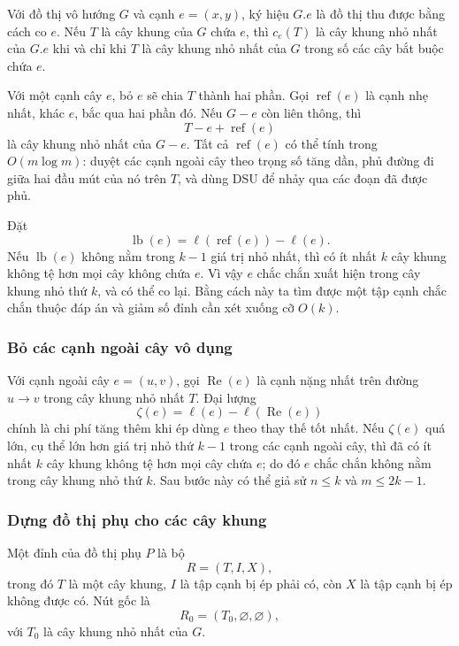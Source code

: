 \documentclass[11pt]{article}
\begin{document}
Với đồ thị vô hướng \(G\) và cạnh \(e=(x,y)\), ký hiệu \(G.e\) là đồ thị thu
được bằng cách co \(e\). Nếu \(T\) là cây khung của \(G\) chứa \(e\), thì
\(c_e(T)\) là cây khung nhỏ nhất của \(G.e\) khi và chỉ khi \(T\) là cây khung
nhỏ nhất của \(G\) trong số các cây bắt buộc chứa \(e\).

Với một cạnh cây \(e\), bỏ \(e\) sẽ chia \(T\) thành hai phần. Gọi
\(\operatorname{ref}(e)\) là cạnh nhẹ nhất, khác \(e\), bắc qua hai phần đó.
Nếu \(G-e\) còn liên thông, thì
\[
  T-e+\operatorname{ref}(e)
\]
là cây khung nhỏ nhất của \(G-e\). Tất cả \(\operatorname{ref}(e)\) có thể tính
trong \(O(m\log m)\): duyệt các cạnh ngoài cây theo trọng số tăng dần, phủ
đường đi giữa hai đầu mút của nó trên \(T\), và dùng DSU để nhảy qua các đoạn
đã được phủ.

Đặt
\[
  \operatorname{lb}(e)=\ell(\operatorname{ref}(e))-\ell(e).
\]
Nếu \(\operatorname{lb}(e)\) không nằm trong \(k-1\) giá trị nhỏ nhất, thì có ít
nhất \(k\) cây khung không tệ hơn mọi cây không chứa \(e\). Vì vậy \(e\) chắc
chắn xuất hiện trong cây khung nhỏ thứ \(k\), và có thể co lại. Bằng cách này
ta tìm được một tập cạnh chắc chắn thuộc đáp án và giảm số đỉnh cần xét xuống
cỡ \(O(k)\).

\subsubsection{Bỏ các cạnh ngoài cây vô dụng}

Với cạnh ngoài cây \(e=(u,v)\), gọi \(\operatorname{Re}(e)\) là cạnh nặng nhất
trên đường \(u\to v\) trong cây khung nhỏ nhất \(T\). Đại lượng
\[
  \zeta(e)=\ell(e)-\ell(\operatorname{Re}(e))
\]
chính là chi phí tăng thêm khi ép dùng \(e\) theo thay thế tốt nhất. Nếu
\(\zeta(e)\) quá lớn, cụ thể lớn hơn giá trị nhỏ thứ \(k-1\) trong các cạnh
ngoài cây, thì đã có ít nhất \(k\) cây khung không tệ hơn mọi cây chứa \(e\);
do đó \(e\) chắc chắn không nằm trong cây khung nhỏ thứ \(k\). Sau bước này có
thể giả sử \(n\le k\) và \(m\le 2k-1\).

\subsubsection{Dựng đồ thị phụ cho các cây khung}

Một đỉnh của đồ thị phụ \(P\) là bộ
\[
  R=(T,I,X),
\]
trong đó \(T\) là một cây khung, \(I\) là tập cạnh bị ép phải có, còn \(X\) là
tập cạnh bị ép không được có. Nút gốc là
\[
  R_0=(T_0,\varnothing,\varnothing),
\]
với \(T_0\) là cây khung nhỏ nhất của \(G\).
\end{document}
